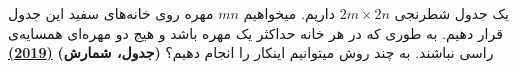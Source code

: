 یک جدول شطرنجی $2m \times 2n$ داریم. میخواهیم $mn$ مهره روی خانه‌های سفید این جدول قرار دهیم. به طوری که در هر خانه حداکثر یک مهره باشد و هیج دو مهره‌ای همسایه‌ی راسی نباشند.
به چند روش میتوانیم اینکار را انجام دهیم؟
\textbf{(جدول، شمارش)}
\href{https://artofproblemsolving.com/community/c6h1811674p12071600}{\textbf{(2019)}}